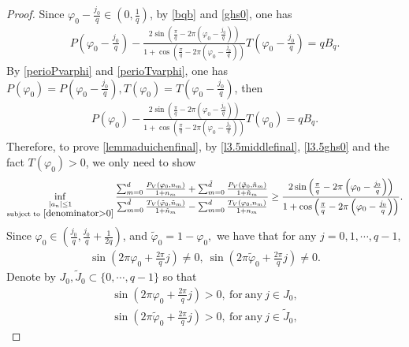 \documentclass[12pt]{amsart}
\newcommand{\abs}[1]{\left\lvert #1 \right\rvert}
\theoremstyle{plain}
\theoremstyle{definition}
\begin{document}
\begin{proof}
		
		Since $\varphi_0-\frac{j_0}{q}\in \left(0,\frac{1}{q}\right)$, by \eqref{bqb} and \eqref{ghs0}, one has
		\begin{align}
		P\left(\varphi_0-\frac{j_0}{q}\right)-\frac{2\sin\left(\frac{\pi}{q}-2\pi\left(\varphi_0-\frac{j_0}{q}\right)\right)}{1+\cos\left(\frac{\pi}{q}-2\pi\left(\varphi_0-\frac{j_0}{q}\right)\right)}T\left(\varphi_0-\frac{j_0}{q}\right)=qB_q.\nonumber
		\end{align}
	    By \eqref{perioPvarphi} and \eqref{perioTvarphi}, one has $P(\varphi_0)=	P\left(\varphi_0-\frac{j_0}{q}\right), T(\varphi_0)=T\left(\varphi_0-\frac{j_0}{q}\right)$, then
	    \begin{align}
	    	P\left(\varphi_0\right)-\frac{2\sin\left(\frac{\pi}{q}-2\pi\left(\varphi_0-\frac{j_0}{q}\right)\right)}{1+\cos\left(\frac{\pi}{q}-2\pi\left(\varphi_0-\frac{j_0}{q}\right)\right)}T\left(\varphi_0\right)=qB_q.\label{l3.5ghs0}
	    \end{align}
	    Therefore, to prove \eqref{lemmaduichenfinal}, by \eqref{l3.5middlefinal}, \eqref{l3.5ghs0} and the fact $T(\varphi_0)>0$, we only need to show
	    		\begin{align}
	    		\inf_{\substack{\abs{a_n}\leq1\\ \text{subject to}\  \eqref{denominator>0}}}\frac{\sum_{m=0}^{d}\frac{P_V(\varphi_0,n_{m})}{1+n_{m}}+\sum_{m=0}^{\tilde{d}}\frac{P_V(\tilde{\varphi}_0,\tilde{n}_{m})}{1+\tilde{n}_{m}}}{{\sum_{m=0}^{\tilde{d}}\frac{T_V(\tilde{\varphi}_0,\tilde{n}_{m})}{1+\tilde{n}_{m}}-\sum_{m=0}^{d}\frac{T_V(\varphi_0,n_{m})}{1+n_{m}}}}\geq \frac{2\sin\left(\frac{\pi}{q}-2\pi\left(\varphi_0-\frac{j_0}{q}\right)\right)}{1+\cos\left(\frac{\pi}{q}-2\pi\left(\varphi_0-\frac{j_0}{q}\right)\right)}.\label{lem3.5final}
	    	\end{align}
Since $\varphi_0\in \left(\frac{j_0}{q},\frac{j_0}{q}+\frac{1}{2q}\right)$, and $\tilde{\varphi}_0=1-\varphi_0,$ we have that for any $j=0,1,\cdots,q-1$,
\begin{align}
	\sin \left(2\pi\varphi_0+\frac{2\pi}{q}j\right)\neq0,\ 	\sin \left(2\pi\tilde{\varphi}_0+\frac{2\pi}{q}j\right)\neq0.\nonumber
\end{align}
Denote by $J_0,\tilde{J}_0\subset\{0,\cdots,q-1\}$ so that 
\begin{align}
	\sin \left(2\pi\varphi_0+\frac{2\pi}{q}j\right)>0,\ \mathrm{for\ any}\ j\in J_0,\label{lem3.5sintheta0>0}\\
	\sin \left(2\pi\tilde{\varphi}_0+\frac{2\pi}{q}j\right)>0,\ \mathrm{for\ any}\ j\in \tilde{J}_0,\label{lem3.5sinthetatilde0>0}

\end{align}
\end{proof}
\end{document}
